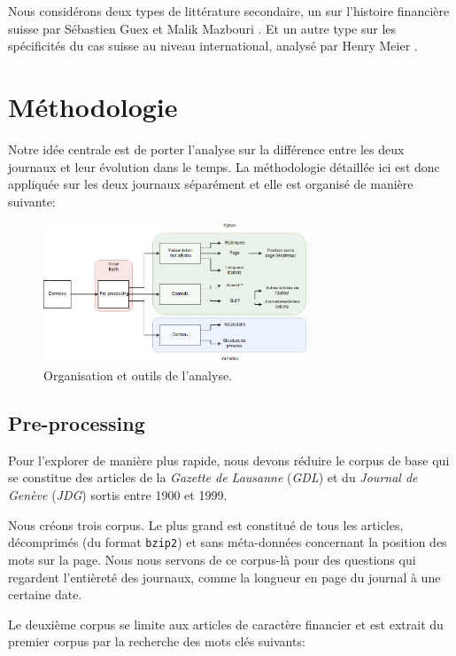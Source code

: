 \documentclass[11pt]{article}
\begin{document}
Nous considérons deux types de littérature secondaire, un sur l’histoire financière
suisse par Sébastien Guex et Malik Mazbouri \citep{Guex99, Guex00, Mazbouri12}.
Et un autre type sur les spécificités du cas suisse au niveau international,
analysé par Henry Meier \citep{Meier12}.


\hypertarget{muxe9thodologie}{%
\section{Méthodologie}\label{muxe9thodologie}}

Notre idée centrale est de porter l'analyse sur la différence entre les
deux journaux et leur évolution dans le temps. La méthodologie détaillée
ici est donc appliquée sur les deux journaux séparément et elle est
organisé de manière suivante:

\begin{figure}
\centering
\includegraphics[width=0.7\textwidth]{methodology/methods.png}
\caption{Organisation et outils de l'analyse.}
\end{figure}

\hypertarget{pre-processing}{%
\subsection{Pre-processing}\label{pre-processing}}

Pour l'explorer de manière plus rapide, nous devons réduire le corpus de
base qui se constitue des articles de la \emph{Gazette de Lausanne}
(\emph{GDL}) et du \emph{Journal de Genève} (\emph{JDG}) sortis entre
1900 et 1999.

Nous créons trois corpus. Le plus grand est constitué de tous les
articles, décomprimés (du format \texttt{bzip2}) et sans méta-données
concernant la position des mots sur la page. Nous nous servons de ce
corpus-là pour des questions qui regardent l'entièreté des journaux,
comme la longueur en page du journal à une certaine date.

Le deuxième corpus se limite aux articles de caractère financier et est
extrait du premier corpus par la recherche des mots clés suivants:
\end{document}
